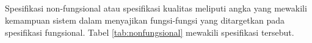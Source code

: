 \documentclass{elsinta}
\begin{document}
\subsection{\NonFunctionalSpecTitle}
Spesifikasi non-fungsional atau spesifikasi kualitas
meliputi angka yang mewakili kemampuan sistem
dalam menyajikan fungsi-fungsi yang ditargetkan pada
spesifikasi fungsional\cite{3.1.1}. Tabel \ref{tab:nonfungsional} mewakili
spesifikasi tersebut.

\end{document}
